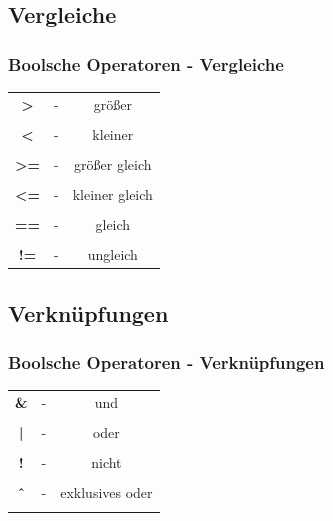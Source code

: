 \documentclass[final]{beamer}
\begin{document}
\subsection{Vergleiche}
\begin{frame}
	\frametitle{Boolsche Operatoren - Vergleiche}
	\begin{tabular}{c c c}
		\textbf{>}  & - & größer \\&&\\
		\textbf{<} & - & kleiner \\&&\\
		\textbf{>=} & - & größer gleich \\&&\\
		\textbf{<=}  & - &  kleiner gleich \\&&\\
		\textbf{==} & - & gleich \\&&\\
		\textbf{!=} & - & ungleich \\
	\end{tabular}
\end{frame}

\subsection{Verknüpfungen}
\begin{frame}
	\frametitle{Boolsche Operatoren - Verknüpfungen}
	\begin{tabular}{c c c}
		\textbf{\&}  & - & und \\&&\\
		\textbf{|} & - & oder \\&&\\
		\textbf{!} & - & nicht \\&&\\
		\textbf{\^\ }  & - &  exklusives oder \\&&\\
	\end{tabular}
\end{frame}
\end{document}
